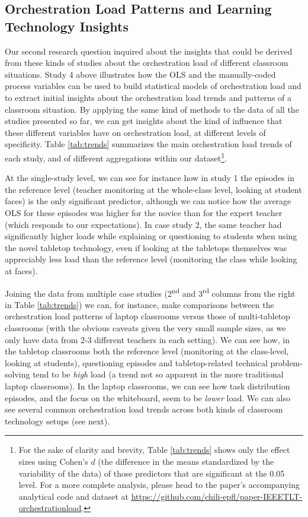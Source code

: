 \documentclass[10pt,journal,compsoc]{IEEEtran}
\begin{document}
\subsection{Orchestration Load Patterns and Learning Technology Insights}

Our second research question inquired about the insights that could be derived from these kinds of studies about the orchestration load of different classroom situations. Study 4 above illustrates how the OLS and the manually-coded process variables can be used to build statistical models of orchestration load and to extract initial insights about the orchestration load trends and patterns of a classroom situation. By applying the same kind of methods to the data of all the studies presented so far, we can get insights about the kind of influence that these different variables have on orchestration load, at different levels of specificity. Table \ref{tab:trends} summarizes the main orchestration load trends of each study, and of different aggregations within our dataset\footnote{For the sake of clarity and brevity, Table \ref{tab:trends} shows only the effect sizes using Cohen's $d$ (the difference in the means standardized by the variability of the data) of those predictors that are significant at the 0.05 level. For a more complete analysis, please head to the paper's accompanying analytical code and dataset at  \href{https://github.com/chili-epfl/paper-IEEETLT-orchestrationload}{https://github.com/chili-epfl/paper-IEEETLT-orchestrationload}.}.

At the single-study level, we can see for instance how in study 1 the episodes in the reference level (teacher monitoring at the whole-class level, looking at student faces) is the only significant predictor, although we can notice how the average OLS for these episodes was higher for the novice than for the expert teacher (which responds to our expectations). In case study 2, the same teacher had significantly higher loads while explaining or questioning to students when using the novel tabletop technology, even if looking at the tabletops themselves was appreciably less load than the reference level (monitoring the class while looking at faces).

Joining the data from multiple case studies (2\textsuperscript{nd} and 3\textsuperscript{rd} columns from the right in Table \ref{tab:trends}) we can, for instance, make comparisons between the orchestration load patterns of laptop classrooms versus those of multi-tabletop classrooms (with the obvious caveats given the very small sample sizes, as we only have data from 2-3 different teachers in each setting). We can see how, in the tabletop classrooms both the reference level (monitoring at the class-level, looking at students), questioning episodes and tabletop-related technical problem-solving tend to be \textit{high} load (a trend not so apparent in the more traditional laptop classrooms). In the laptop classrooms, we can see how task distribution episodes, and the focus on the whiteboard, seem to be \textit{lower} load. We can also see several common orchestration load trends across both kinds of classroom technology setups (see next).
\end{document}
